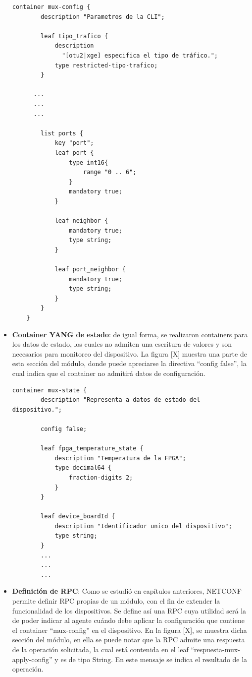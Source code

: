 \begin{itemize}
    \begin{lstlisting}[language=SHELXL, caption=Interacción tipica con un dispositivo mediante \textit{CLI}., label=lstlisting:cli]
    container mux-config {
        description "Parametros de la CLI";

        leaf tipo_trafico {
            description
              "[otu2|xge] especifica el tipo de tráfico.";
            type restricted-tipo-trafico;
        }
      
      ...
      ...
      ...
        
        list ports {
            key "port";
            leaf port {
                type int16{
                    range "0 .. 6";
                }
                mandatory true;
            }

            leaf neighbor {
                mandatory true;
                type string;
            }
            
            leaf port_neighbor {
                mandatory true;
                type string;
            }
        }
    }
    \end{lstlisting}

    \item \textbf{Container YANG de estado}: de igual forma, se realizaron containers para los datos de estado, los cuales no admiten una escritura de valores y son necesarios para monitoreo del dispositivo. La figura [X] muestra una parte de esta sección del módulo, donde puede apreciarse la directiva “config false”, la cual indica que el container no admitirá datos de configuración.  

    \begin{lstlisting}[language=SHELXL, caption=Interacción tipica con un dispositivo mediante \textit{CLI}., label=lstlisting:cli]
    container mux-state {
        description "Representa a datos de estado del dispositivo.";
        
        config false;

        leaf fpga_temperature_state {
            description "Temperatura de la FPGA";
            type decimal64 {
                fraction-digits 2;
            }
        }
   
        leaf device_boardId {
            description "Identificador unico del dispositivo";
            type string;
        }
        ...
        ...
        ...
    \end{lstlisting}


    \item \textbf{Definición de RPC}: Como se estudió en capítulos anteriores, NETCONF permite definir RPC propias de un módulo, con el fin de extender la funcionalidad de los dispositivos. Se define así una RPC cuya utilidad será la de poder indicar al agente cuándo debe aplicar la configuración que contiene el container “mux-config” en el dispositivo. En la figura [X], se muestra dicha sección del módulo, en ella se puede notar que la RPC admite una respuesta de la operación solicitada, la cual está contenida en el leaf “respuesta-mux-apply-config” y es de tipo String. En este mensaje se indica el resultado de la operación.



\end{itemize}
